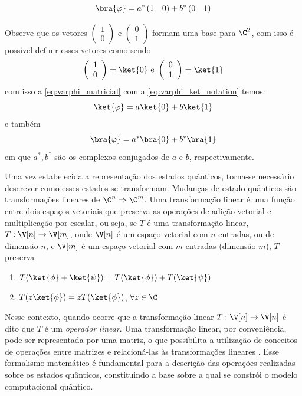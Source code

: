 \begin{equation}\label{eq:bra_varphi_matricial}
\bra{\varphi}=a^*\left(1\quad 0\right) + b^*\left(0\quad 1\right)
\end{equation}

Observe que os vetores $\left(\begin{array}{c}
         1 \\ 
         0
    \end{array}\right)$ e $\left(\begin{array}{c}
         0 \\
         1
    \end{array}\right)$ formam uma base para $\C^2$, com isso é possível definir esses vetores como sendo
\begin{equation}\label{eq:varphi_ket_notation}
\left(\begin{array}{c}
     1 \\
     0
\end{array}\right)=\ket{0}\text{ e }\left(\begin{array}{c}
     0 \\
     1
\end{array}\right)=\ket{1}
\end{equation}
com isso a \autoref{eq:varphi_matricial} com a \autoref{eq:varphi_ket_notation} temos:
$$\ket{\varphi}=a\ket{0}+b\ket{1}$$
\noindent e também 
$$\bra{\varphi}=a^*\bra{0}+b^*\bra{1}$$
\noindent em que $a^*, b^*$ são os complexos conjugados de $a$ e $b$, respectivamente.

Uma vez estabelecida a representação dos estados quânticos, torna-se necessário descrever como esses estados se transformam. Mudanças de estado quânticos são transformações lineares de $\C^n\Rightarrow \C^m$. Uma transformação linear é uma função entre dois espaços vetoriais que preserva as operações de adição vetorial e multiplicação por escalar, ou seja, se $T$ é uma transformação linear, $T:\V[n]\rightarrow\V[m]$, onde $\V[n]$ é um espaço vetorial com $n$ entradas, ou de dimensão $n$, e $\V[m]$ é um espaço vetorial com $m$ entradas (dimensão $m$), $T$ preserva
\begin{enumerate}
    \item $T(\ket{\phi}+\ket{\psi}) = T(\ket{\phi})+T(\ket{\psi})$
    \item $T(z\ket{\phi})=zT(\ket{\phi})$, $\forall z\in\C$
\end{enumerate}

Nesse contexto, quando ocorre que a transformação linear $T:\V[n]\rightarrow\V[n]$ é dito que $T$ é um \textit{operador linear}. Uma transformação linear, por conveniência, pode ser representada por uma matriz, o que possibilita a utilização de conceitos de operações entre matrizes e relacioná-las às transformações lineares \cite{dettman1986introduction}. Esse formalismo matemático é fundamental para a descrição das operações realizadas sobre os estados quânticos, constituindo a base sobre a qual se constrói o modelo computacional quântico.

